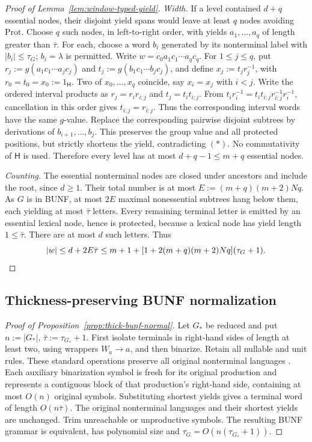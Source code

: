\documentclass[11pt,a4paper]{article}
\theoremstyle{remark}
\theoremstyle{plain}
\begin{document}
\begin{proof}[Proof of Lemma~\ref{lem:window-typed-yield}]
\emph{Width.}
If a level contained $d+q$ essential nodes,
their disjoint yield spans would leave at least
$q$ nodes avoiding $\mathrm{Prot}$. Choose $q$
such nodes, in left-to-right order, with yields
$a_1,\ldots,a_q$ of length greater than $\bar\tau$.
For each, choose a word $b_i$ generated by its
nonterminal label with $|b_i|\le\tau_G$;
$b_i=\lambda$ is permitted.
Write $w=c_0a_1c_1\cdots a_qc_q$.
For $1\le j\le q$, put
$r_j:=g(a_1c_1\cdots a_jc_j)$ and
$t_j:=g(b_1c_1\cdots b_jc_j)$, and define
$x_j:=t_jr_j^{-1}$, with $r_0=t_0=x_0:=1_{\mathsf H}$.
Two of $x_0,\ldots,x_q$ coincide, say
$x_i=x_j$ with $i<j$. Write the ordered interval
products as $r_j=r_i r_{i:j}$ and
$t_j=t_i t_{i:j}$. From
$t_i r_i^{-1}=t_i t_{i:j}r_{i:j}^{-1}r_i^{-1}$,
cancellation in this order gives
$t_{i:j}=r_{i:j}$. Thus the corresponding
interval words have the same $g$-value.
Replace the corresponding pairwise disjoint
subtrees by derivations of $b_{i+1},\ldots,b_j$.
This preserves the group value and all protected
positions, but strictly shortens the yield,
contradicting $(\ast)$. No commutativity
of $\mathsf H$ is used. Therefore every
level has at most $d+q-1\le m+q$
essential nodes.

\emph{Counting.}
The essential nonterminal nodes are closed under
ancestors and include the root, since
$d\ge1$. Their total number is at most
$E:=(m+q)(m+2)Nq$.
As $G$ is in BUNF, at most $2E$ maximal
nonessential subtrees hang below them, each
yielding at most $\bar\tau$ letters.
Every remaining terminal letter is emitted
by an essential lexical node, hence is
protected, because a lexical node has yield
length $1\le\bar\tau$.
There are at most $d$ such letters. Thus
\[
|w|\le d+2E\bar\tau
\le m+1+
[1+2(m+q)(m+2)Nq](\tau_G+1).
\qedhere
\]
\end{proof}

\subsection{Thickness-preserving BUNF normalization}
\label{app:thick-bunf}
\begin{proof}[Proof of Proposition~\ref{prop:thick-bunf-normal}]
Let $G_*$ be reduced and put $n:=|G_*|$,
$\bar\tau:=\tau_{G_*}+1$.
First isolate terminals in right-hand sides
of length at least two, using wrappers
$W_a\to a$, and then binarize.
Retain all nullable and unit rules.
These standard operations preserve all
original nonterminal languages
\cite[Section~3.1]{autebert1997}
\cite[Sections~7.1 and~7.4.2]{hopcroft-motwani-ullman2007}.
Each auxiliary binarization symbol is fresh
for its original production and represents a
contiguous block of that production's right-hand
side, containing at most $O(n)$ original symbols.
Substituting shortest yields gives a terminal
word of length $O(n\bar\tau)$.
The original nonterminal languages and their
shortest yields are unchanged.
Trim unreachable or unproductive symbols.
The resulting BUNF grammar is equivalent,
has polynomial size and
$\tau_G=O(n(\tau_{G_*}+1))$.
\end{proof}
\end{document}
